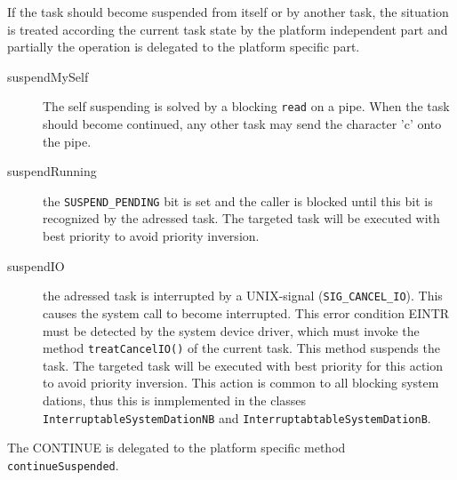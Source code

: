 If the task should become suspended from itself or by another task, 
the situation is treated according the current task state by the
platform independent part and partially the operation is delegated 
to the platform specific part.

\begin{description}

\item[suspendMySelf] 
The self suspending is solved by a blocking \verb|read| on a pipe.
When the task should become continued,
 any other task may send the character 'c' onto the pipe.

\item[suspendRunning] the \verb|SUSPEND_PENDING| bit is set and the caller
   is blocked until this bit is recognized by the adressed task.
   The targeted task will be executed with best priority to avoid
   priority inversion.

\item[suspendIO] the adressed task is interrupted by a 
   UNIX-signal (\verb|SIG_CANCEL_IO|). This causes the system
   call to become interrupted. This error condition EINTR must 
   be detected by the system device driver, which must invoke the method
   \verb|treatCancelIO()| of the current task. This method suspends 
   the task.
   The targeted task will be executed with best priority for this 
   action to avoid priority inversion.
   This action is common to all blocking system dations, thus this is 
   inmplemented in the classes \verb|InterruptableSystemDationNB| and
   \verb|InterruptabtableSystemDationB|.
\end{description}

The CONTINUE is delegated to the platform specific method
\verb|continueSuspended|.

